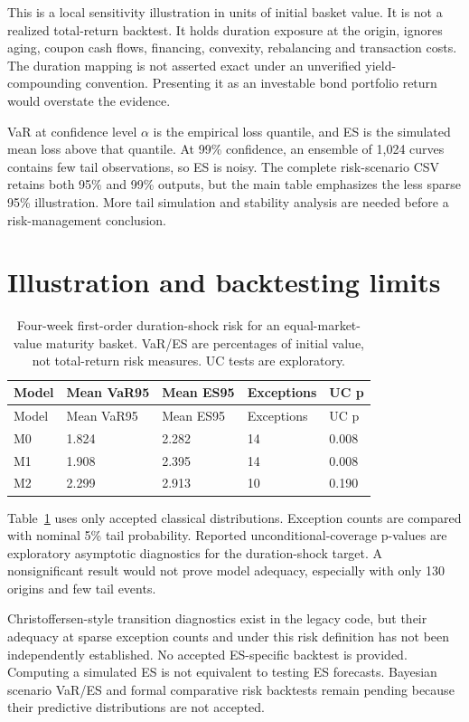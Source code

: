 \documentclass[
  12pt,
  letterpaper,
  DIV=11,
  numbers=noendperiod]{scrreprt}
\begin{document}
This is a local sensitivity illustration in units of initial basket
value. It is not a realized total-return backtest. It holds duration
exposure at the origin, ignores aging, coupon cash flows, financing,
convexity, rebalancing and transaction costs. The duration mapping is
not asserted exact under an unverified yield-compounding convention.
Presenting it as an investable bond portfolio return would overstate the
evidence.

VaR at confidence level \(\alpha\) is the empirical loss quantile, and
ES is the simulated mean loss above that quantile. At 99\% confidence,
an ensemble of 1,024 curves contains few tail observations, so ES is
noisy. The complete risk-scenario CSV retains both 95\% and 99\%
outputs, but the main table emphasizes the less sparse 95\%
illustration. More tail simulation and stability analysis are needed
before a risk-management conclusion.

\section{Illustration and backtesting
limits}\label{illustration-and-backtesting-limits}

\begin{longtable}[]{@{}lllll@{}}
\caption{Four-week first-order duration-shock risk for an
equal-market-value maturity basket. VaR/ES are percentages of initial
value, not total-return risk measures. UC tests are
exploratory.}\label{tbl-risk}\tabularnewline
\toprule\noalign{}
Model & Mean VaR95 & Mean ES95 & Exceptions & UC p \\
\midrule\noalign{}
\endfirsthead
\toprule\noalign{}
Model & Mean VaR95 & Mean ES95 & Exceptions & UC p \\
\midrule\noalign{}
\endhead
\bottomrule\noalign{}
\endlastfoot
M0 & 1.824 & 2.282 & 14 & 0.008 \\
M1 & 1.908 & 2.395 & 14 & 0.008 \\
M2 & 2.299 & 2.913 & 10 & 0.190 \\
\end{longtable}

Table~\ref{tbl-risk} uses only accepted classical distributions.
Exception counts are compared with nominal 5\% tail probability.
Reported unconditional-coverage p-values are exploratory asymptotic
diagnostics for the duration-shock target. A nonsignificant result would
not prove model adequacy, especially with only 130 origins and few tail
events.

Christoffersen-style transition diagnostics exist in the legacy code,
but their adequacy at sparse exception counts and under this risk
definition has not been independently established. No accepted
ES-specific backtest is provided. Computing a simulated ES is not
equivalent to testing ES forecasts. Bayesian scenario VaR/ES and formal
comparative risk backtests remain pending because their predictive
distributions are not accepted.
\end{document}
